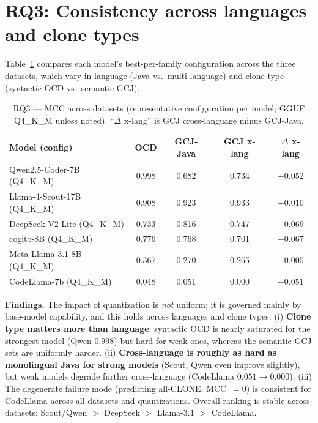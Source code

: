 \documentclass[11pt]{article}
\begin{document}
\section{RQ3: Consistency across languages and clone types}
Table~\ref{tab:rq3} compares each model's best-per-family configuration across
the three datasets, which vary in language (Java vs.\ multi-language) and clone
type (syntactic OCD vs.\ semantic GCJ).

\begin{table}[htbp]
  \centering
  \caption{RQ3 --- MCC across datasets (representative configuration per model;
           GGUF Q4\_K\_M unless noted). ``$\Delta$ x-lang'' is GCJ
           cross-language minus GCJ-Java.}
  \label{tab:rq3}
  \small
  \begin{tabular}{lcccc}
    \toprule
    \textbf{Model (config)} & \textbf{OCD} & \textbf{GCJ-Java} & \textbf{GCJ x-lang} & \textbf{$\Delta$ x-lang} \\
    \midrule
    Qwen2.5-Coder-7B (Q4\_K\_M)       & 0.998 & 0.682 & 0.734 & $+0.052$ \\
    Llama-4-Scout-17B (Q4\_K\_M)      & 0.908 & 0.923 & 0.933 & $+0.010$ \\
    DeepSeek-V2-Lite (Q4\_K\_M)       & 0.733 & 0.816 & 0.747 & $-0.069$ \\
    cogito-8B (Q4\_K\_M)              & 0.776 & 0.768 & 0.701 & $-0.067$ \\
    Meta-Llama-3.1-8B (Q4\_K\_M)      & 0.367 & 0.270 & 0.265 & $-0.005$ \\
    CodeLlama-7b (Q4\_K\_M)           & 0.048 & 0.051 & 0.000 & $-0.051$ \\
    \bottomrule
  \end{tabular}
\end{table}

\noindent\textbf{Findings.} The impact of quantization is \emph{not} uniform;
it is governed mainly by base-model capability, and this holds across languages
and clone types. (i) \textbf{Clone type matters more than language}: syntactic
OCD is nearly saturated for the strongest model (Qwen $0.998$) but hard for weak
ones, whereas the semantic GCJ sets are uniformly harder. (ii)
\textbf{Cross-language is roughly as hard as monolingual Java for strong
models} (Scout, Qwen even improve slightly), but weak models degrade further
cross-language (CodeLlama $0.051\!\rightarrow\!0.000$). (iii) The degenerate
failure mode (predicting all-CLONE, MCC~$=0$) is consistent for CodeLlama across
all datasets and quantizations. Overall ranking is stable across datasets:
Scout/Qwen $>$ DeepSeek $>$ Llama-3.1 $>$ CodeLlama.
\end{document}
